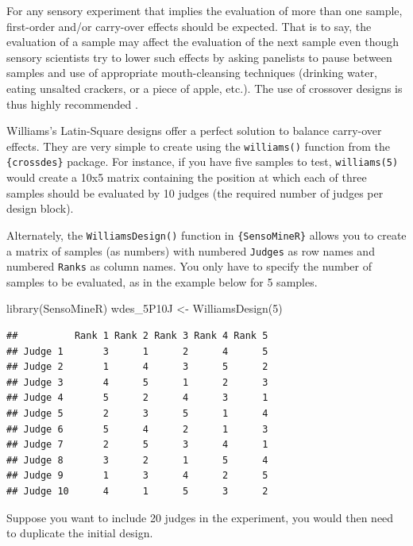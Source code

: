 \documentclass[
]{krantz}
\makeatletter
\newenvironment{Shaded}{\begin{snugshade}}{\end{snugshade}}
\newcommand{\DecValTok}[1]{\textcolor[rgb]{0.06,0.06,0.06}{#1}}
\newcommand{\FunctionTok}[1]{\textcolor[rgb]{0,0,0}{#1}}
\newcommand{\NormalTok}[1]{#1}
\newcommand{\OtherTok}[1]{\textcolor[rgb]{0.37,0.37,0.37}{#1}}
\newenvironment{kframe}{%
\medskip{}
\setlength{\fboxsep}{.8em}
 \def\at@end@of@kframe{}%
 \ifinner\ifhmode%
  \def\at@end@of@kframe{\end{minipage}}%
  \begin{minipage}{\columnwidth}%
 \fi\fi%
 \def\FrameCommand##1{\hskip\@totalleftmargin \hskip-\fboxsep
 \colorbox{shadecolor}{##1}\hskip-\fboxsep
     \hskip-\linewidth \hskip-\@totalleftmargin \hskip\columnwidth}%
 \MakeFramed {\advance\hsize-\width
   \@totalleftmargin\z@ \linewidth\hsize
   \@setminipage}}%
 {\par\unskip\endMakeFramed%
 \at@end@of@kframe}
\renewenvironment{Shaded}{\begin{kframe}}{\end{kframe}}
\makeatother
\begin{document}
For any sensory experiment that implies the evaluation of more than one sample, first-order and/or carry-over effects should be expected. That is to say, the evaluation of a sample may affect the evaluation of the next sample even though sensory scientists try to lower such effects by asking panelists to pause between samples and use of appropriate mouth-cleansing techniques (drinking water, eating unsalted crackers, or a piece of apple, etc.). The use of crossover designs is thus highly recommended \citep{Macfie1989}.

Williams's Latin-Square designs offer a perfect solution to balance carry-over effects. They are very simple to create using the \texttt{williams()} function from the \texttt{\{crossdes\}} package. For instance, if you have five samples to test, \texttt{williams(5)} would create a 10x5 matrix containing the position at which each of three samples should be evaluated by 10 judges (the required number of judges per design block).

Alternately, the \texttt{WilliamsDesign()} function in \texttt{\{SensoMineR\}} allows you to create a matrix of samples (as numbers) with numbered \texttt{Judges} as row names and numbered \texttt{Ranks} as column names. You only have to specify the number of samples to be evaluated, as in the example below for 5 samples.

\begin{Shaded}
\begin{Highlighting}[]
\FunctionTok{library}\NormalTok{(SensoMineR)}
\NormalTok{wdes\_5P10J }\OtherTok{\textless{}{-}} \FunctionTok{WilliamsDesign}\NormalTok{(}\DecValTok{5}\NormalTok{)}
\end{Highlighting}
\end{Shaded}

\begin{verbatim}
##          Rank 1 Rank 2 Rank 3 Rank 4 Rank 5
## Judge 1       3      1      2      4      5
## Judge 2       1      4      3      5      2
## Judge 3       4      5      1      2      3
## Judge 4       5      2      4      3      1
## Judge 5       2      3      5      1      4
## Judge 6       5      4      2      1      3
## Judge 7       2      5      3      4      1
## Judge 8       3      2      1      5      4
## Judge 9       1      3      4      2      5
## Judge 10      4      1      5      3      2
\end{verbatim}

Suppose you want to include 20 judges in the experiment, you would then need to duplicate the initial design.
\end{document}
